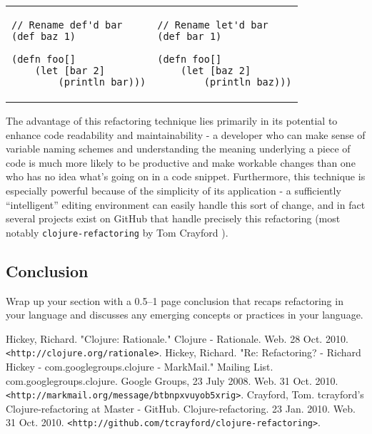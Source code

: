 \documentclass{article}
\begin{document}
\begin{tabular}{m{2in} m{2in}} \\
\begin{verbatim}
// Rename def'd bar
(def baz 1)

(defn foo[]
    (let [bar 2]
        (println bar)))
\end{verbatim}
&
\begin{verbatim}
// Rename let'd bar
(def bar 1)

(defn foo[]
    (let [baz 2]
        (println baz)))
\end{verbatim}
\end{tabular}

The advantage of this refactoring technique lies primarily in its potential to enhance code readability and maintainability - a developer who can make sense of variable naming schemes and understanding the meaning underlying a piece of code is much more likely to be productive and make workable changes than one who has no idea what's going on in a code snippet. Furthermore, this technique is especially powerful because of the simplicity of its application - a sufficiently ``intelligent'' editing environment can easily handle this sort of change, and in fact several projects exist on GitHub that handle precisely this refactoring (most notably \verb!clojure-refactoring! by Tom Crayford \cite{3}).

\subsection{Conclusion}

Wrap up your section with a 0.5--1 page conclusion that recaps refactoring in your language and discusses any emerging concepts or practices in your language.

\begin{thebibliography}{9}
 Hickey, Richard. "Clojure: Rationale." Clojure - Rationale. Web. 28 Oct. 2010. \verb!<http://clojure.org/rationale>!.
 Hickey, Richard. "Re: Refactoring? - Richard Hickey - com.googlegroups.clojure - MarkMail." Mailing List. com.googlegroups.clojure. Google Groups, 23 July 2008. Web. 31 Oct. 2010. \verb!<http://markmail.org/message/btbnpxvuyob5xrig>!.
 Crayford, Tom. tcrayford's Clojure-refactoring at Master - GitHub. Clojure-refactoring. 23 Jan. 2010. Web. 31 Oct. 2010. \verb!<http://github.com/tcrayford/clojure-refactoring>!.
\end{thebibliography}
\end{document}
